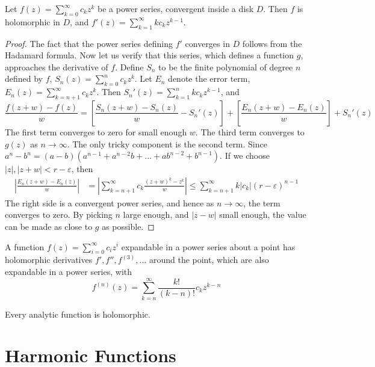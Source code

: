 \begin{theorem}
    Let $f(z) = \sum_{k = 0}^\infty c_k z^k$ be a power series, convergent inside a disk $D$. Then $f$ is holomorphic in $D$, and $f'(z) = \sum_{k = 1}^\infty k c_k z^{k-1}$.
\end{theorem}
\begin{proof}
    The fact that the power series defining $f'$ converges in $D$ follows from the Hadamard formula. Now let us verify that this series, which defines a function $g$, approaches the derivative of $f$. Define $S_n$ to be the finite polynomial of degree $n$ defined by $f$, $S_n(z) = \sum_{k = 0}^n c_k z^k$. Let $E_n$ denote the error term, $E_n(z) = \sum_{k = n+1}^\infty c_k z^k$. Then $S_n'(z) = \sum_{k = 1}^n k c_k z^{k-1}$, and
    \[ \frac{f(z + w) - f(z)}{w} = \left[ \frac{S_n(z + w) - S_n(z)}{w} - S_n'(z) \right] + \left[ \frac{E_n(z + w) - E_n(z)}{w} \right] + S_n'(z) \]
    The first term converges to zero for small enough $w$. The third term converges to $g(z)$ as $n \to \infty$. The only tricky component is the second term. Since $a^n - b^n = (a - b)(a^{n-1} + a^{n-2}b + \dots + ab^{n-2} + b^{n-1})$. If we choose $|z|, |z + w| < r - \varepsilon$, then
    \begin{align*}
        \left| \frac{E_n(z + w) - E_n(z)}{w} \right| &= \left| \sum_{k = n + 1}^\infty c_k \frac{(z + w)^k - z^k}{w} \right| \leq \sum_{k = n + 1}^\infty k |c_k| (r - \varepsilon)^{n-1}
    \end{align*}
    The right side is a convergent power series, and hence as $n \to \infty$, the term converges to zero. By picking $n$ large enough, and $|z - w|$ small enough, the value can be made as close to $g$ as possible.
\end{proof}

\begin{corollary}
    A function $f(z) = \sum_{i = 0}^\infty c_i z^i$ expandable in a power series about a point has holomorphic derivatives $f', f'', f^{(3)}, \dots$ around the point, which are also expandable in a power series, with
    \[ f^{(n)}(z) = \sum_{k = n}^\infty \frac{k!}{(k - n)!} c_k z^{k-n} \]
\end{corollary}

\begin{corollary}
    Every analytic function is holomorphic.
\end{corollary}

\section{Harmonic Functions}

